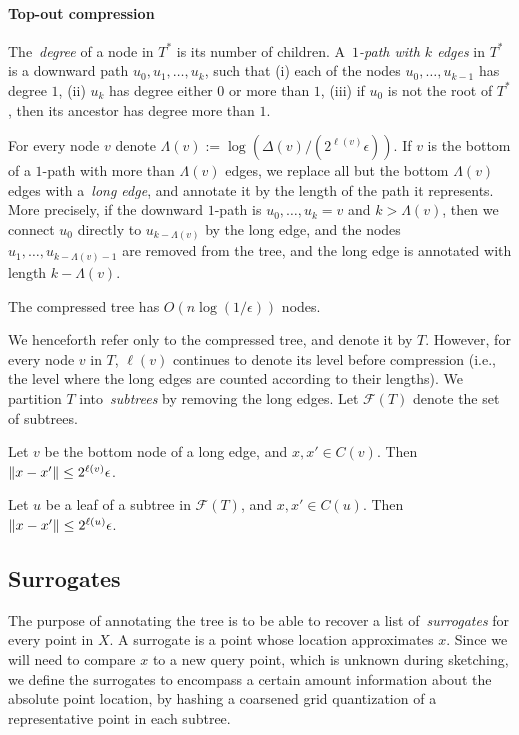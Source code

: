 \paragraph{Top-out compression}
The~\emph{degree} of a node in $T^*$ is its number of children.
A~\emph{$1$-path with $k$ edges} in  $T^*$ is a downward path $u_0,u_1,\ldots,u_k$, such that (i) each of the nodes $u_0,\ldots,u_{k-1}$ has degree $1$, (ii) $u_k$ has degree either $0$ or more than $1$, (iii) if $u_0$ is not the root of $T^*$, then its ancestor has degree more than $1$.

For every node $v$ denote $\Lambda(v) := \log(\Delta(v)/(2^{\ell(v)}\epsilon))$. 
If $v$ is the bottom of a $1$-path with more than $\Lambda(v)$ edges, we replace all but the bottom $\Lambda(v)$ edges with a~\emph{long edge}, and annotate it by the length of the path it represents.
More precisely, if the downward $1$-path is $u_0,\ldots,u_k=v$ and $k>\Lambda(v)$, then we connect $u_0$ directly to $u_{k-\Lambda(v)}$ by the long edge, and the nodes $u_1,\ldots,u_{k-\Lambda(v)-1}$ are removed from the tree, and the long edge is annotated with length $k-\Lambda(v)$.

\begin{lemma}\label{lmm:tree_size}
The compressed tree has $O(n\log(1/\epsilon))$ nodes.
\end{lemma}


We henceforth refer only to the compressed tree, and denote it by $T$.
However, for every node $v$ in $T$, $\ell(v)$ continues to denote its level before compression (i.e., the level where the long edges are counted according to their lengths).
We partition $T$ into~\emph{subtrees} by removing the long edges.
Let $\mathcal F(T)$ denote the set of subtrees.

\begin{lemma}\label{lmm:subtree_root}
Let $v$ be the bottom node of a long edge, and $x,x'\in C(v)$. Then $\lVert x-x'\rVert\leq2^{\ell(v)}\epsilon$.
\end{lemma}

\begin{lemma}\label{lmm:subtree_leaf}
Let $u$ be a leaf of a subtree in $\mathcal F(T)$, and $x,x'\in C(u)$. Then $\lVert x-x'\rVert\leq2^{\ell(u)}\epsilon$.
\end{lemma}


\subsection{Surrogates}
The purpose of annotating the tree is to be able to recover a list of~\emph{surrogates} for every point in $X$.
A surrogate is a point whose location approximates $x$.
Since we will need to compare $x$ to a new query point, which is unknown during sketching, we define the surrogates to encompass a certain amount information about the absolute point location, by hashing a coarsened grid quantization of a representative point in each subtree.

